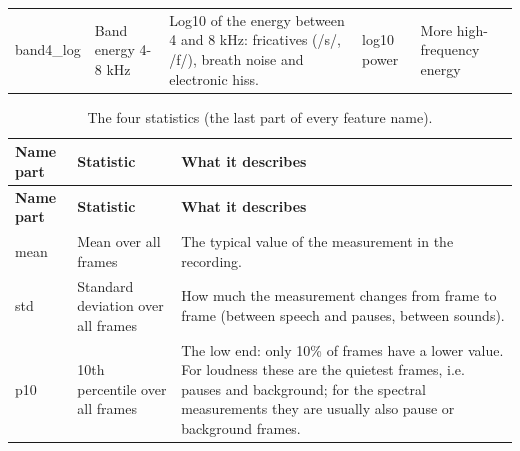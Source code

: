 \documentclass[11pt,a4paper]{article}
\begin{document}
\begin{center}
\begin{longtable}{>{\raggedright\arraybackslash}p{2.14cm}>{\raggedright\arraybackslash}p{2.23cm}>{\raggedright\arraybackslash}p{5.95cm}>{\raggedright\arraybackslash}p{1.67cm}>{\raggedright\arraybackslash}p{2.42cm}}
\hspace{0pt}band4\_\allowbreak{}log & \hspace{0pt}Band energy 4-8 kHz & \hspace{0pt}Log10 of the energy between 4 and 8 kHz: fricatives (/\allowbreak{}s/\allowbreak{}, /\allowbreak{}f/\allowbreak{}), breath noise and electronic hiss. & \hspace{0pt}log10 power & \hspace{0pt}More high-frequency energy\\
\end{longtable}\end{center}
\begin{center}\small\renewcommand{\arraystretch}{1.15}
\begin{longtable}{>{\raggedright\arraybackslash}p{1.76cm}>{\raggedright\arraybackslash}p{4.10cm}>{\raggedright\arraybackslash}p{9.38cm}}
\caption{The four statistics (the last part of every feature name).}\\
\toprule
\textbf{\hspace{0pt}Name part} & \textbf{\hspace{0pt}Statistic} & \textbf{\hspace{0pt}What it describes}\\\midrule\endfirsthead
\toprule
\textbf{\hspace{0pt}Name part} & \textbf{\hspace{0pt}Statistic} & \textbf{\hspace{0pt}What it describes}\\\midrule\endhead
\bottomrule\endfoot
\hspace{0pt}mean & \hspace{0pt}Mean over all frames & \hspace{0pt}The typical value of the measurement in the recording.\\
\hspace{0pt}std & \hspace{0pt}Standard deviation over all frames & \hspace{0pt}How much the measurement changes from frame to frame (between speech and pauses, between sounds).\\
\hspace{0pt}p10 & \hspace{0pt}10th percentile over all frames & \hspace{0pt}The low end: only 10\% of frames have a lower value. For loudness these are the quietest frames, i.e. pauses and background; for the spectral measurements they are usually also pause or background frames.\\

\end{longtable}
\end{center}
\end{document}
